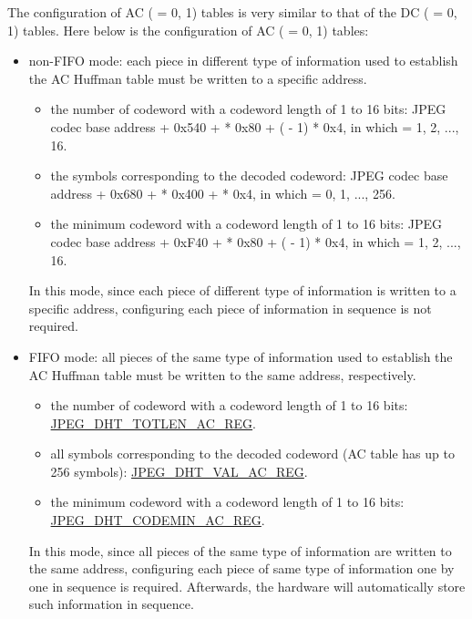 \documentclass[main\_\_EN.tex]{subfiles}
\begin{document}
The configuration of AC ( = 0, 1) tables is very similar to that of the DC ( = 0, 1) tables. Here below is the configuration of AC ( = 0, 1) tables:

\begin{itemize}
    \item non-FIFO mode: each piece in different type of information used to establish the AC Huffman table must be written to a specific address.
    \begin{itemize}
        \item the number of codeword with a codeword length of 1 to 16 bits: JPEG codec base address + 0x540 +  * 0x80 + ( - 1) * 0x4, in which  = 1, 2, ..., 16.
        \item the symbols corresponding to the decoded codeword: JPEG codec base address + 0x680 +  * 0x400 +  * 0x4, in which  = 0, 1, ..., 256.
        \item the minimum codeword with a codeword length of 1 to 16 bits: JPEG codec base address + 0xF40 +  * 0x80 + ( - 1) * 0x4, in which  = 1, 2, ..., 16.
    \end{itemize}
    In this mode, since each piece of different type of information is written to a specific address, configuring each piece of information in sequence is not required.
    \item FIFO mode: all pieces of the same type of information used to establish the AC Huffman table must be written to the same address, respectively.
    \begin{itemize}
        \item the number of codeword with a codeword length of 1 to 16 bits: \hyperref[regdesc:JPEGDHTTOTLENAC0REG]{JPEG\_DHT\_TOTLEN\_AC\_REG}.
        \item all symbols corresponding to the decoded codeword (AC table has up to 256 symbols): \hyperref[regdesc:JPEGDHTVALAC0REG]{JPEG\_DHT\_VAL\_AC\_REG}.
        \item the minimum codeword with a codeword length of 1 to 16 bits:  \hyperref[regdesc:JPEGDHTCODEMINAC0REG]{JPEG\_DHT\_CODEMIN\_AC\_REG}.
    \end{itemize}
    In this mode, since all pieces of the same type of information are written to the same address, configuring each piece of same type of information one by one in sequence is required. Afterwards, the hardware will automatically store such information in sequence.
\end{itemize}
\end{document}
